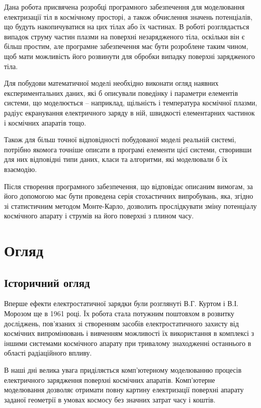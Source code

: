 \documentclass[a4paper,12pt]{article}
\begin{document}
Дана робота присвячена розробці програмного забезпечення для моделювання електризації тіл в космічному просторі, а також обчислення значень потенціалів, що будуть накопичуватися на цих тілах або їх частинах. В роботі розглядається випадок струму частин плазми на поверхні незарядженого тіла, оскільки він є більш простим, але програмне забезпечення має бути розроблене таким чином, щоб мати можливість його розвинути для обробки випадку поверхні зарядженого тіла.

Для побудови математичної моделі необхідно виконати огляд наявних експериментальних даних, які б описували поведінку і параметри елементів системи, що моделюється -- наприклад, щільність і температура космічної плазми, радіус екранування електричного заряду в ній, швидкості елементарних частинок і космічних апаратів тощо.
 
Також для більш точної відповідності побудованої моделі реальній системі, потрібно якомога точніше описати в програмі елементи цієї системи, створивши для них відповідні типи даних, класи та алгоритми, які моделювали б їх взаємодію.

Після створення програмного забезпечення, що відповідає описаним вимогам, за його допомогою має бути проведена серія стохастичних випробувань, яка, згідно зі статистичним методом Монте-Карло, дозволить прослідкувати зміну потенціалу космічного апарату і струмів на його поверхні з плином часу.

\newpage

\section{Огляд}
\subsection{Історичний огляд}
Вперше ефекти електростатичної зарядки були розглянуті В.Г. Куртом і В.І. Морозом ще в 1961 році. Їх робота стала потужним поштовхом в розвитку досліджень, пов’язаних зі створенням засобів електростатичного захисту від космічних випромінювань і вивченням можливості їх використання в комплексі з іншими системами космічного апарату при тривалому знаходженні останнього в області радіаційного впливу.

В наші дні велика увага приділяється комп’ютерному моделюванню процесів електричного зарядження  поверхні космічних апаратів. Комп’ютерне моделювання дозволяє отримати повну картину електризації поверхні апарату заданої геометрії в умовах космосу без значних затрат часу і коштів.
\end{document}
